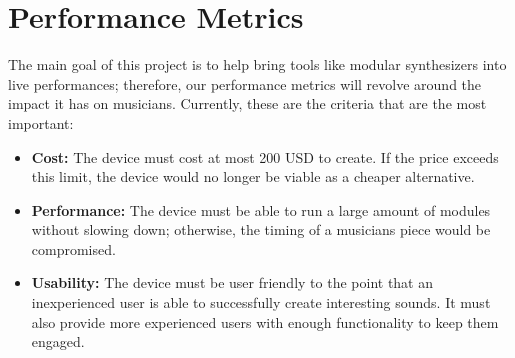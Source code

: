 \section{Performance Metrics}
The main goal of this project is to help bring tools like modular synthesizers into live performances; therefore, our performance metrics will revolve around the impact it has on musicians.
Currently, these are the criteria that are the most important:
\begin{itemize}
    \item \textbf{Cost:}
        The device must cost at most 200 USD to create. If the price exceeds this limit, the device would no longer be viable as a cheaper alternative.
        
    \item \textbf{Performance:}
        The device must be able to run a large amount of modules without slowing down; otherwise, the timing of a musicians piece would be compromised.
        
    \item \textbf{Usability:}
        The device must be user friendly to the point that an inexperienced user is able to successfully create interesting sounds. It must also provide more experienced users with enough functionality to keep them engaged.
\end{itemize}


